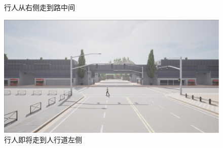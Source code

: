\begin{figure}[H]
\begin{minipage}{0.24\textwidth}
        \caption{行人从右侧走到路中间}
    \end{minipage}%
    \begin{minipage}{0.24\textwidth}
        \centering
        \includegraphics[width=\textwidth]{images/crossing_walking4.pdf}
        \caption{行人即将走到人行道左侧}
    \end{minipage}
    
    \vspace{0.5cm}  %
    

\end{figure}
